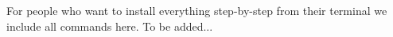 For people who want to install everything step-by-step from their terminal we include all commands here. To be added...
